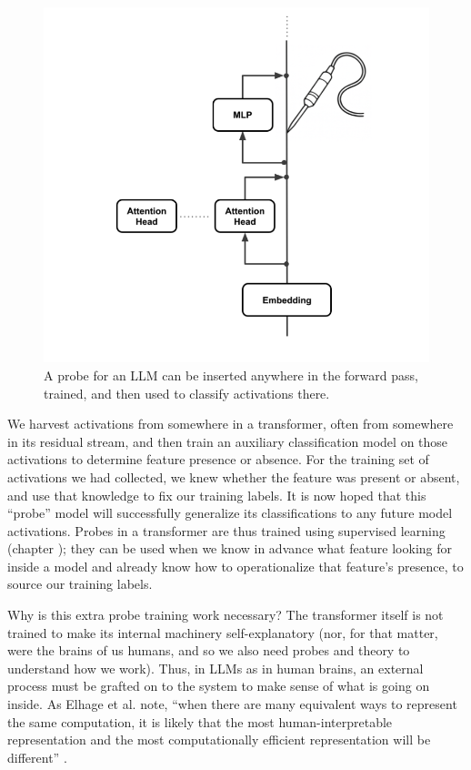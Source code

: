 \begin{figure}[ht]
\centering
\includegraphics[scale=.5]{./images/linearProbe.png}
\caption[Jeff Yoshimi; the line art for the probe was generated by ChatGPT.]{ A
      probe for an LLM can be inserted anywhere in the forward pass, trained,
      and then used to classify activations there.}
\label{linearProbe}
\end{figure}

We harvest activations from somewhere in a transformer, often from somewhere in
its residual stream, and then train an auxiliary classification model on those
activations to determine feature presence or absence. For the training set of
activations we had collected, we knew whether the feature was present or
absent, and use that knowledge to fix our training labels. It is now hoped that
this ``probe'' model will successfully generalize its classifications to any
future model activations. Probes in a transformer are thus trained using
supervised learning (chapter ); they can be used when we
know in advance what feature looking for inside a model and already know how to
operationalize that feature's presence, to source our training labels.

Why is this extra probe training work necessary? The transformer itself is not
trained to make its internal machinery self-explanatory (nor, for that matter,
were the brains of us humans, and so we also need probes and theory to
understand how we work). Thus, in LLMs as in human brains, an external process
must be grafted on to the system to make sense of what is going on inside. As
Elhage et al. note, ``when there are many equivalent ways to represent the same
computation, it is likely that the most human-interpretable representation and
the most computationally efficient representation will be different''
\cite{elhage2021mathematical}.

